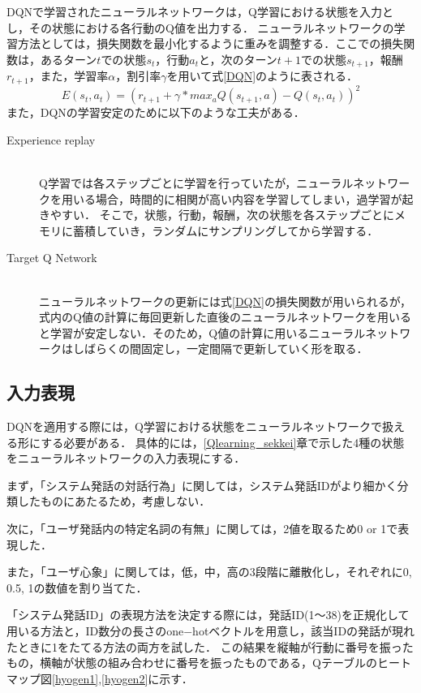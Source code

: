 \documentclass[a4j,dvipdfmx]{jarticle}
\begin{document}
DQNで学習されたニューラルネットワークは，Q学習における状態を入力とし，その状態における各行動のQ値を出力する．
ニューラルネットワークの学習方法としては，損失関数を最小化するように重みを調整する．ここでの損失関数は，あるターン$t$での状態$s_{t}$，行動$a_{t}$と，次のターン$t+1$での状態$s_{t+1}$，報酬$r_{t+1}$，また，学習率$\alpha$，割引率$\gamma$を用いて式\ref{DQN}のように表される．
\begin{equation}
\label{DQN}
E(s_t,a_t) = (r_{t+1}+\gamma*max_aQ(s_{t+1},a)-Q(s_t,a_t))^2
\end{equation}
また，DQNの学習安定のために以下のような工夫がある．
\begin{description}
   \item[Experience replay]\mbox{}\\
   Q学習では各ステップごとに学習を行っていたが，ニューラルネットワークを用いる場合，時間的に相関が高い内容を学習してしまい，過学習が起きやすい．
   そこで，状態，行動，報酬，次の状態を各ステップごとにメモリに蓄積していき，ランダムにサンプリングしてから学習する．
   \item[Target Q Network]\mbox{}\\%
   ニューラルネットワークの更新には式\ref{DQN}の損失関数が用いられるが，式内のQ値の計算に毎回更新した直後のニューラルネットワークを用いると学習が安定しない．そのため，Q値の計算に用いるニューラルネットワークはしばらくの間固定し，一定間隔で更新していく形を取る．
\end{description}
\subsection{入力表現}%
DQNを適用する際には，Q学習における状態をニューラルネットワークで扱える形にする必要がある．
具体的には，\ref{Qlearning_sekkei}章で示した4種の状態をニューラルネットワークの入力表現にする．

まず，「システム発話の対話行為」に関しては，システム発話IDがより細かく分類したものにあたるため，考慮しない．

次に，「ユーザ発話内の特定名詞の有無」に関しては，2値を取るため0 or 1で表現した．

また，「ユーザ心象」に関しては，低，中，高の3段階に離散化し，それぞれに0, 0.5, 1の数値を割り当てた．

「システム発話ID」の表現方法を決定する際には，発話ID(1〜38)を正規化して用いる方法と，ID数分の長さのone$-$hotベクトルを用意し，該当IDの発話が現れたときに1をたてる方法の両方を試した．
この結果を縦軸が行動に番号を振ったもの，横軸が状態の組み合わせに番号を振ったものである，Qテーブルのヒートマップ図\ref{hyogen1},\ref{hyogen2}に示す．
\end{document}
